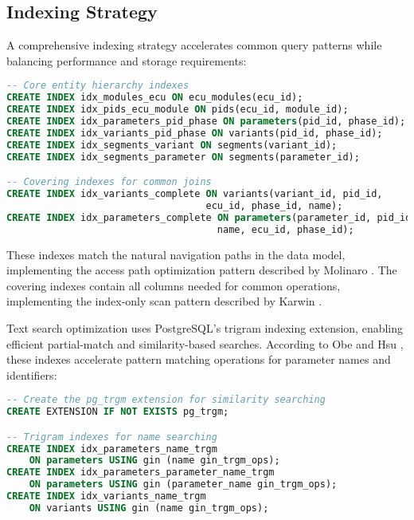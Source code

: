 \subsection{Indexing Strategy}
\label{subsec:indexing-strategy}

A comprehensive indexing strategy accelerates common query patterns while balancing performance and storage requirements:

\begin{lstlisting}[language=SQL, caption={Hierarchical Access Path Indexing Implementation}, label={lst:hierarchical-indexing}]
-- Core entity hierarchy indexes
CREATE INDEX idx_modules_ecu ON ecu_modules(ecu_id);
CREATE INDEX idx_pids_ecu_module ON pids(ecu_id, module_id);
CREATE INDEX idx_parameters_pid_phase ON parameters(pid_id, phase_id);
CREATE INDEX idx_variants_pid_phase ON variants(pid_id, phase_id);
CREATE INDEX idx_segments_variant ON segments(variant_id);
CREATE INDEX idx_segments_parameter ON segments(parameter_id);

-- Covering indexes for common joins
CREATE INDEX idx_variants_complete ON variants(variant_id, pid_id, 
                                   ecu_id, phase_id, name);
CREATE INDEX idx_parameters_complete ON parameters(parameter_id, pid_id, 
                                     name, ecu_id, phase_id);
\end{lstlisting}

These indexes match the natural navigation paths in the data model, implementing the access path optimization pattern described by Molinaro \cite{molinaro2005sql}. The covering indexes contain all columns needed for common operations, implementing the index-only scan pattern described by Karwin \cite{karwin2010sql}.

Text search optimization uses PostgreSQL's trigram indexing extension, enabling efficient partial-match and similarity-based searches. According to Obe and Hsu \cite{obe2017postgresql}, these indexes accelerate pattern matching operations for parameter names and identifiers:

\begin{lstlisting}[language=SQL, caption={Text Search Optimization Implementation}, label={lst:text-search-optimization}]
-- Create the pg_trgm extension for similarity searching
CREATE EXTENSION IF NOT EXISTS pg_trgm;

-- Trigram indexes for name searching
CREATE INDEX idx_parameters_name_trgm 
    ON parameters USING gin (name gin_trgm_ops);
CREATE INDEX idx_parameters_parameter_name_trgm 
    ON parameters USING gin (parameter_name gin_trgm_ops);
CREATE INDEX idx_variants_name_trgm 
    ON variants USING gin (name gin_trgm_ops);
\end{lstlisting}

